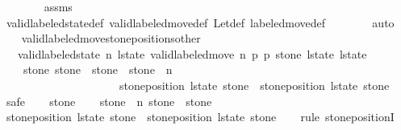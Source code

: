 \begin{isabellebody}
\ \ \ \ \ \ \isamarkupfalse%
\ assms\isanewline
\ \ \ \ \ \ \isamarkupfalse%
\ valid{\isacharunderscore}labeled{\isacharunderscore}state{\isacharunderscore}def\ valid{\isacharunderscore}labeled{\isacharunderscore}move{\isacharprime}{\isacharunderscore}def\ Let{\isacharunderscore}def\ labeled{\isacharunderscore}move{\isacharunderscore}def\isanewline
\ \ \ \ \ \ \isamarkupfalse%
\ auto\isanewline
\ \ \isamarkupfalse%
\isanewline
{}\isamarkupfalse%
%
\endisatagproof
{\isafoldproof}%
%
\isadelimproof
\isanewline
%
\endisadelimproof
\isanewline
{}\isamarkupfalse%
\ valid{\isacharunderscore}labeled{\isacharunderscore}move{\isacharprime}{\isacharunderscore}stone{\isacharunderscore}positions{\isacharunderscore}other{\isacharcolon}\isanewline
\ \ \ {\isachardoublequoteopen}valid{\isacharunderscore}labeled{\isacharunderscore}state\ n\ l{\isacharunderscore}state{\isachardoublequoteclose}\ {\isachardoublequoteopen}valid{\isacharunderscore}labeled{\isacharunderscore}move{\isacharprime}\ n\ p{}\ p{}\ stone\ l{\isacharunderscore}state\ l{\isacharunderscore}state{\isacharprime}{\isachardoublequoteclose}\isanewline
\ \ \ {\isachardoublequoteopen}{\isasymforall}\ stone{\isacharprime}{\isachardot}\ stone{\isacharprime}\ {\isasymnoteq}\ stone\ {\isasymand}\ stone{\isacharprime}\ {\isacharless}\ n\ {\isasymlongrightarrow}\ \isanewline
\ \ \ \ \ \ \ \ \ \ \ \ \ \ \ \ \ \ \ \ \ stone{\isacharunderscore}position\ l{\isacharunderscore}state{\isacharprime}\ stone{\isacharprime}\ {\isacharequal}\ stone{\isacharunderscore}position\ l{\isacharunderscore}state\ stone{\isacharprime}{\isachardoublequoteclose}\isanewline
%
\isadelimproof
%
\endisadelimproof
%
\isatagproof
{}\isamarkupfalse%
\ safe\isanewline
\ \ \isamarkupfalse%
\ stone{\isacharprime}\isanewline
\ \ \isamarkupfalse%
\ {\isachardoublequoteopen}stone{\isacharprime}\ {\isacharless}\ n{\isachardoublequoteclose}\ {\isachardoublequoteopen}stone{\isacharprime}\ {\isasymnoteq}\ stone{\isachardoublequoteclose}\isanewline
\ \ \isamarkupfalse%
\ {\isachardoublequoteopen}stone{\isacharunderscore}position\ l{\isacharunderscore}state{\isacharprime}\ stone{\isacharprime}\ {\isacharequal}\ stone{\isacharunderscore}position\ l{\isacharunderscore}state\ stone{\isacharprime}{\isachardoublequoteclose}\isanewline
\ \ \isamarkupfalse%
\ {\isacharparenleft}rule\ stone{\isacharunderscore}positionI{\isacharparenright}\isanewline

\end{isabellebody}
